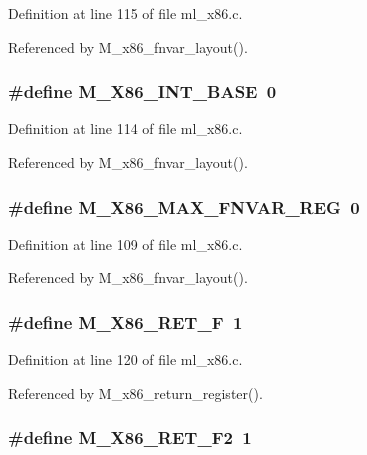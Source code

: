 Definition at line 115 of file ml\_\-x86.c.

Referenced by M\_\-x86\_\-fnvar\_\-layout().
\subsubsection{\setlength{\rightskip}{0pt plus 5cm}\#define M\_\-X86\_\-INT\_\-BASE~0}\label{ml__x86_8c_894b42ac087d4778b69b958c65384a12}




Definition at line 114 of file ml\_\-x86.c.

Referenced by M\_\-x86\_\-fnvar\_\-layout().
\subsubsection{\setlength{\rightskip}{0pt plus 5cm}\#define M\_\-X86\_\-MAX\_\-FNVAR\_\-REG~0}\label{ml__x86_8c_d2e32239ccacaae56519d5dc882fd5be}




Definition at line 109 of file ml\_\-x86.c.

Referenced by M\_\-x86\_\-fnvar\_\-layout().
\subsubsection{\setlength{\rightskip}{0pt plus 5cm}\#define M\_\-X86\_\-RET\_\-F~1}\label{ml__x86_8c_ce421de89db7404f3e0d2efd0520d463}




Definition at line 120 of file ml\_\-x86.c.

Referenced by M\_\-x86\_\-return\_\-register().
\subsubsection{\setlength{\rightskip}{0pt plus 5cm}\#define M\_\-X86\_\-RET\_\-F2~1}\label{ml__x86_8c_4497cc816e22b00ce41091909ce76667}




